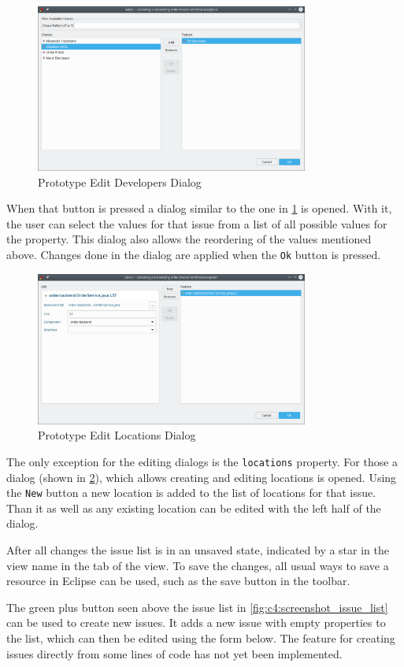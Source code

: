\begin{figure}[!h]
	\centering
	\includegraphics[width=0.8\textwidth]{graphics/screenshot_gropius_ei_edit_list.png}
	\caption{Prototype Edit Developers Dialog}
	\label{fig:c4:screenshot_edit_list}
\end{figure}

When that button is pressed a dialog similar to the one in \cref{fig:c4:screenshot_edit_list} is opened.
With it, the user can select the values for that issue from a list of all possible values for the property.
This dialog also allows the reordering of the values mentioned above.
Changes done in the dialog are applied when the \lstinline|Ok| button is pressed.

\begin{figure}[!h]
	\centering
	\includegraphics[width=0.8\textwidth]{graphics/screenshot_gropius_ei_edit_locations.png}
	\caption{Prototype Edit Locations Dialog}
	\label{fig:c4:screenshot_edit_locations}
\end{figure}

The only exception for the editing dialogs is the \lstinline|locations| property.
For those a dialog (shown in \cref{fig:c4:screenshot_edit_locations}), which allows creating and editing locations is opened.
Using the \lstinline|New| button a new location is added to the list of locations for that issue.
Than it as well as any existing location can be edited with the left half of the dialog.

After all changes the issue list is in an unsaved state, indicated by a star in the view name in the tab of the view.
To save the changes, all usual ways to save a resource in \gls{Eclipse} can be used, such as the save button in the toolbar.

The green plus button seen above the issue list in \cref{fig:c4:screenshot_issue_list} can be used to create new issues.
It adds a new issue with empty properties to the list, which can then be edited using the form below.
The feature for creating issues directly from some lines of code has not yet been implemented.
